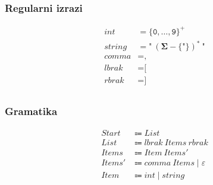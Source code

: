 \documentclass{report}
\newcommand{\Null}{\varepsilon}
\newcommand{\Char}[1]{\texttt{#1}}
\newcommand{\Spc}{\ }
\newcommand{\Union}{\mathrel{|}}
\newcommand{\Kleene}[1]{{#1}^\ast}
\newcommand{\KleenePlus}[1]{#1^+}
\newcommand{\Set}[1]{\symbf{#1}}
\newcommand{\Alphabet}{\Set{\Sigma}}
\newcommand{\Arrow}{\Coloneq}
\newcommand{\NT}[1]{{#1}}
\newcommand{\T}[1]{{#1}}
\begin{document}
\subsubsection*{Regularni izrazi}
\begin{equation*}
  \begin{aligned}
    \T{int} &= \KleenePlus{\{\Char{0}, \dots, \Char{9}\}}\\
    \T{string} &= \Char{"} \Spc \Kleene{(\Alphabet - \{\Char{"}\})} \Spc \Char{"}\\
    \T{comma} &= \Char{,}\\
    \T{lbrak} &= \Char{[}\\
    \T{rbrak} &= \Char{]}\\
  \end{aligned}
\end{equation*}

\subsubsection*{Gramatika}
\begin{equation*}
  \begin{aligned}
    \NT{Start} &\Arrow \NT{List}\\
    \NT{List} &\Arrow \T{lbrak} \Spc \NT{Items} \Spc \T{rbrak}\\
    \NT{Items} &\Arrow \NT{Item} \Spc \NT{Items'}\\
    \NT{Items'} &\Arrow \T{comma} \Spc \NT{Items} \Union \Null\\
    \NT{Item} &\Arrow \T{int} \Union \T{string}
  \end{aligned}
\end{equation*}
\end{document}

